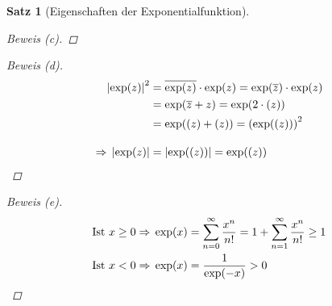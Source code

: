 \documentclass[11pt, twoside, a4paper]{article}
\theoremstyle{plain}
\newtheorem{satz}[blockelement]{Satz}
\newcommand{\pair}[1]{\left(#1\right)}
\newcommand{\abs}[1]{\left\lvert#1\right\rvert}
\newcommand{\impl}[0]{\Rightarrow{}}
\newcommand{\conj}[1]{\overline{#1}}
\let\Re\relax
\DeclareMathOperator{\Re}{Re}
\begin{document}
\begin{satz}[Eigenschaften der Exponentialfunktion]
\begin{proof}[Beweis (c)]
        \end{proof}
        \begin{proof}[Beweis (d)]
            \begin{align*}
                \abs{\exp(z)}^2 &= \conj{\exp(z)}\cdot \exp(z) = \exp(\conj{z})\cdot \exp(z)\\
                &= \exp(\conj{z} + z) = \exp(2\cdot \Re(z))\\
                &=\exp(\Re(z)+ \Re(z)) = \pair{\exp(\Re(z))}^2\\[10pt]
                \impl \abs{\exp(z)} &= \abs{\exp(\Re(z))} = \exp(\Re(z))\qedhere
            \end{align*}
        \end{proof}
        \begin{proof}[Beweis (e)]
            \begin{align*}
                \text{Ist } x \geq 0 &\impl \exp(x) = \sum_{n=0}^{\infty} \frac{x^n}{n!}= 1 + \sum_{n=1}^{\infty} \frac{x^n}{n!}\geq 1\\
                \text{Ist } x < 0 &\impl \exp(x) = \frac{1}{\exp(-x)} > 0\qedhere
            \end{align*}
        \end{proof}
    \end{satz}
\end{document}
